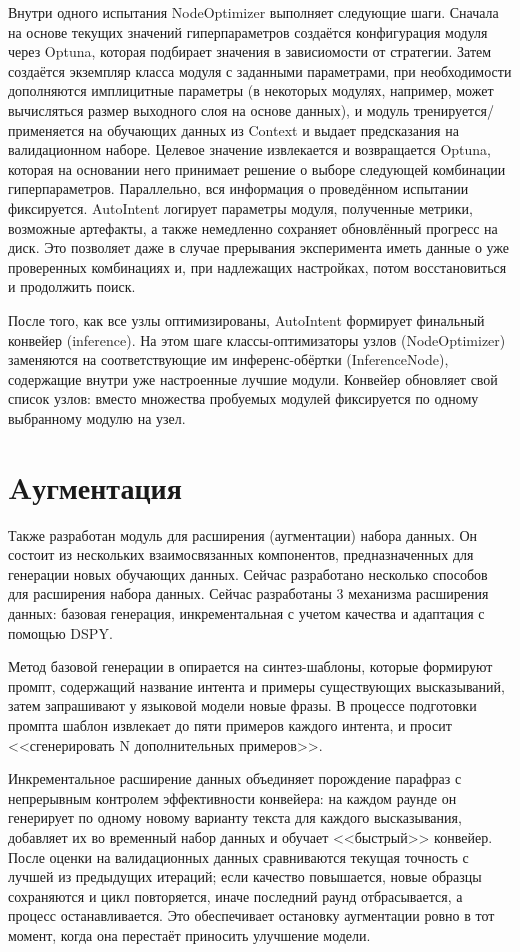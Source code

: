 \documentclass[14pt,a4paper,oneside,openany]{extbook}
\begin{document}
Внутри одного испытания NodeOptimizer выполняет следующие шаги. Сначала на основе текущих значений гиперпараметров создаётся конфигурация модуля через Optuna, которая подбирает значения в зависиомости от стратегии. Затем создаётся экземпляр класса модуля с заданными параметрами, при необходимости дополняются имплицитные параметры (в некоторых модулях, например, может вычисляться размер выходного слоя на основе данных), и модуль тренируется/применяется на обучающих данных из Context и выдает предсказания на валидационном наборе. Целевое значение извлекается и возвращается Optuna, которая на основании него принимает решение о выборе следующей комбинации гиперпараметров. Параллельно, вся информация о проведённом испытании фиксируется. AutoIntent логирует параметры модуля, полученные метрики, возможные артефакты, а также немедленно сохраняет обновлённый прогресс на диск. Это позволяет даже в случае прерывания эксперимента иметь данные о уже проверенных комбинациях и, при надлежащих настройках, потом восстановиться и продолжить поиск.

После того, как все узлы оптимизированы, AutoIntent формирует финальный конвейер (inference). На этом шаге классы-оптимизаторы узлов (NodeOptimizer) заменяются на соответствующие им инференс-обёртки (InferenceNode), содержащие внутри уже настроенные лучшие модули. Конвейер обновляет свой список узлов: вместо множества пробуемых модулей фиксируется по одному выбранному модулю на узел.
\section{Aугментация}
\label{sec:org4951242}
Также разработан модуль для расширения (аугментации) набора данных. Он состоит из нескольких взаимосвязанных компонентов, предназначенных для генерации новых обучающих данных. Сейчас разработано несколько способов для расширения набора данных. Сейчас разработаны 3 механизма расширения данных: базовая генерация, инкрементальная с учетом качества и адаптация с помощью DSPY\autocite{khattab_dspy_2023}.

Метод базовой генерации в опирается на синтез-шаблоны, которые формируют промпт, содержащий название интента и примеры существующих высказываний, затем запрашивают у языковой модели новые фразы. В процессе подготовки промпта шаблон извлекает до пяти примеров каждого интента, и просит {}<<сгенерировать N дополнительных примеров>>{}.

Инкрементальное расширение данных объединяет порождение парафраз с непрерывным контролем эффективности конвейера: на каждом раунде он генерирует по одному новому варианту текста для каждого высказывания, добавляет их во временный набор данных и обучает {}<<быстрый>>{} конвейер. После оценки на валидационных данных сравниваются текущая точность с лучшей из предыдущих итераций; если качество повышается, новые образцы сохраняются и цикл повторяется, иначе последний раунд отбрасывается, а процесс останавливается. Это обеспечивает остановку аугментации ровно в тот момент, когда она перестаёт приносить улучшение модели.
\end{document}
